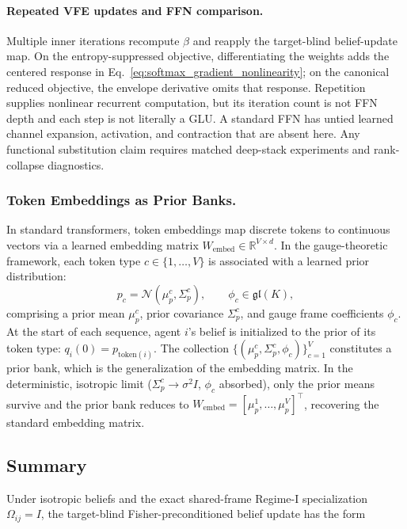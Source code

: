\documentclass[twoside,11pt]{article}
\begin{document}
\paragraph{Repeated VFE updates and FFN comparison.}
Multiple inner iterations recompute $\beta$ and reapply the target-blind belief-update map. On the entropy-suppressed objective, differentiating the weights adds the centered response in Eq.~\eqref{eq:softmax_gradient_nonlinearity}; on the canonical reduced objective, the envelope derivative omits that response. Repetition supplies nonlinear recurrent computation, but its iteration count is not FFN depth and each step is not literally a GLU. A standard FFN has untied learned channel expansion, activation, and contraction that are absent here. Any functional substitution claim requires matched deep-stack experiments and rank-collapse diagnostics.

\subsubsection{Token Embeddings as Prior Banks.}
\label{sec:embeddings}

In standard transformers, token embeddings map discrete tokens to continuous vectors via a learned embedding matrix $W_{\text{embed}} \in \mathbb{R}^{V \times d}$. In the gauge-theoretic framework, each token type $c \in \{1, \ldots, V\}$ is associated with a learned prior distribution:
\begin{equation}
p_c = \mathcal{N}(\mu_p^c, \Sigma_p^c), \qquad \phi_c \in \mathfrak{gl}(K),
\label{eq:prior_bank}
\end{equation}
comprising a prior mean $\mu_p^c$, prior covariance $\Sigma_p^c$, and gauge frame coefficients $\phi_c$. At the start of each sequence, agent $i$'s belief is initialized to the prior of its token type: $q_i(0) = p_{\mathrm{token}(i)}$. The collection $\{(\mu_p^c, \Sigma_p^c, \phi_c)\}_{c=1}^V$ constitutes a prior bank, which is the generalization of the embedding matrix. In the deterministic, isotropic limit ($\Sigma_p^c \to \sigma^2 I$, $\phi_c$ absorbed), only the prior means survive and the prior bank reduces to $W_{\text{embed}} = [\mu_p^1, \ldots, \mu_p^V]^\top$, recovering the standard embedding matrix.


\subsection{Summary}

Under isotropic beliefs and the exact shared-frame Regime-I specialization $\Omega_{ij} = I$, the target-blind Fisher-preconditioned belief update has the form
\end{document}
